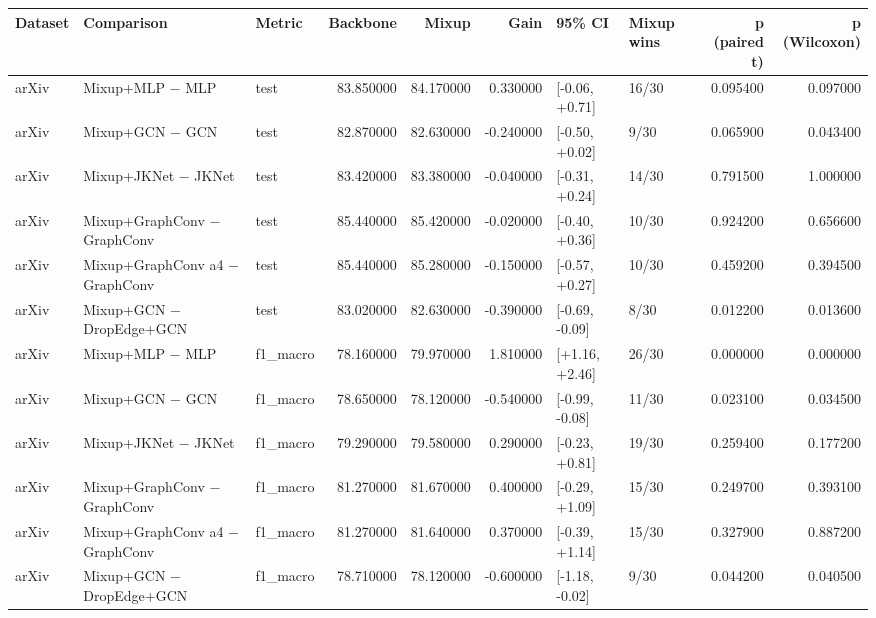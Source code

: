 \begin{tabular}{lllrrrllrr}
\toprule
Dataset & Comparison & Metric & Backbone & Mixup & Gain & 95\% CI & Mixup wins & p (paired t) & p (Wilcoxon) \\
\midrule
arXiv & Mixup+MLP − MLP & test & 83.850000 & 84.170000 & 0.330000 & [-0.06, +0.71] & 16/30 & 0.095400 & 0.097000 \\
arXiv & Mixup+GCN − GCN & test & 82.870000 & 82.630000 & -0.240000 & [-0.50, +0.02] & 9/30 & 0.065900 & 0.043400 \\
arXiv & Mixup+JKNet − JKNet & test & 83.420000 & 83.380000 & -0.040000 & [-0.31, +0.24] & 14/30 & 0.791500 & 1.000000 \\
arXiv & Mixup+GraphConv − GraphConv & test & 85.440000 & 85.420000 & -0.020000 & [-0.40, +0.36] & 10/30 & 0.924200 & 0.656600 \\
arXiv & Mixup+GraphConv a4 − GraphConv & test & 85.440000 & 85.280000 & -0.150000 & [-0.57, +0.27] & 10/30 & 0.459200 & 0.394500 \\
arXiv & Mixup+GCN − DropEdge+GCN & test & 83.020000 & 82.630000 & -0.390000 & [-0.69, -0.09] & 8/30 & 0.012200 & 0.013600 \\
arXiv & Mixup+MLP − MLP & f1\_macro & 78.160000 & 79.970000 & 1.810000 & [+1.16, +2.46] & 26/30 & 0.000000 & 0.000000 \\
arXiv & Mixup+GCN − GCN & f1\_macro & 78.650000 & 78.120000 & -0.540000 & [-0.99, -0.08] & 11/30 & 0.023100 & 0.034500 \\
arXiv & Mixup+JKNet − JKNet & f1\_macro & 79.290000 & 79.580000 & 0.290000 & [-0.23, +0.81] & 19/30 & 0.259400 & 0.177200 \\
arXiv & Mixup+GraphConv − GraphConv & f1\_macro & 81.270000 & 81.670000 & 0.400000 & [-0.29, +1.09] & 15/30 & 0.249700 & 0.393100 \\
arXiv & Mixup+GraphConv a4 − GraphConv & f1\_macro & 81.270000 & 81.640000 & 0.370000 & [-0.39, +1.14] & 15/30 & 0.327900 & 0.887200 \\
arXiv & Mixup+GCN − DropEdge+GCN & f1\_macro & 78.710000 & 78.120000 & -0.600000 & [-1.18, -0.02] & 9/30 & 0.044200 & 0.040500 \\
\bottomrule
\end{tabular}
